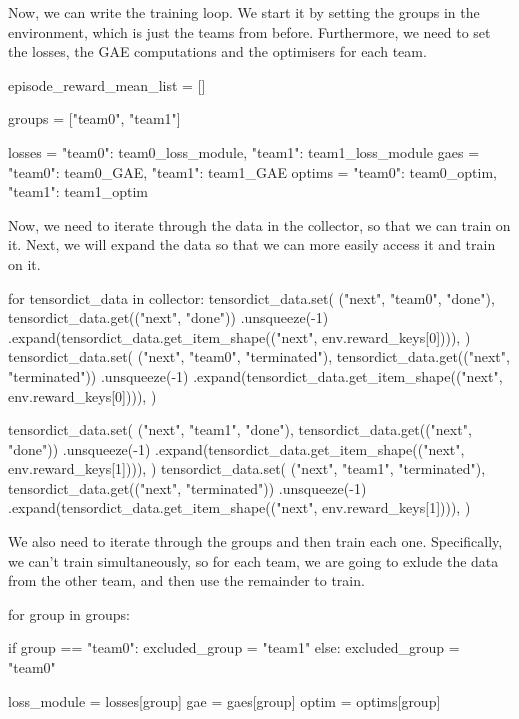 Now, we can write the training loop. We start it by setting the groups in the environment, which is just the teams from before. Furthermore, we need to set the losses, the GAE computations and the optimisers for each team.

\begin{mpy}
episode_reward_mean_list = []

groups = ["team0", "team1"]

losses = {"team0": team0_loss_module, "team1": team1_loss_module}
gaes = {"team0": team0_GAE, "team1": team1_GAE}
optims = {"team0": team0_optim, "team1": team1_optim}
\end{mpy}

Now, we need to iterate through the data in the collector, so that we can train on it. Next, we will expand the data so that we can more easily access it and train on it.

\begin{mpy}
for tensordict_data in collector:
    tensordict_data.set(
        ("next", "team0", "done"),
        tensordict_data.get(("next", "done"))
        .unsqueeze(-1)
        .expand(tensordict_data.get_item_shape(("next", env.reward_keys[0]))),
    )
    tensordict_data.set(
        ("next", "team0", "terminated"),
        tensordict_data.get(("next", "terminated"))
        .unsqueeze(-1)
        .expand(tensordict_data.get_item_shape(("next", env.reward_keys[0]))),
    )

    tensordict_data.set(
        ("next", "team1", "done"),
        tensordict_data.get(("next", "done"))
        .unsqueeze(-1)
        .expand(tensordict_data.get_item_shape(("next", env.reward_keys[1]))),
    )
    tensordict_data.set(
        ("next", "team1", "terminated"),
        tensordict_data.get(("next", "terminated"))
        .unsqueeze(-1)
        .expand(tensordict_data.get_item_shape(("next", env.reward_keys[1]))),
    )
\end{mpy}

We also need to iterate through the groups and then train each one. Specifically, we can't train simultaneously, so for each team, we are going to exlude the data from the other team, and then use the remainder to train.

\begin{mpy}
    for group in groups:

        if group == "team0":
            excluded_group = "team1"
        else:
            excluded_group = "team0"

        loss_module = losses[group]
        gae = gaes[group]
        optim = optims[group]
\end{mpy}

